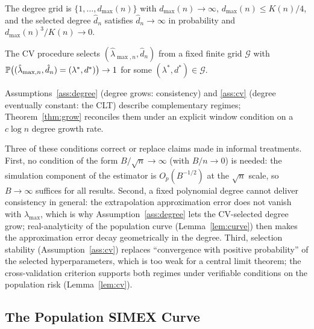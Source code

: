 \begin{assumption}\label{ass:degree}
The degree grid is $\{1,\dots,d_{\max}(n)\}$ with
$d_{\max}(n)\to\infty$, $d_{\max}(n)\le K(n)/4$, and the selected
degree $\hat d_n$ satisfies $\hat d_n\to\infty$ in probability and
$d_{\max}(n)^3/K(n)\to 0$.
\end{assumption}

\begin{assumption}\label{ass:cv}
The CV procedure selects $(\hat\lambda_{\max,n},\hat d_n)$ from a
fixed finite grid $\mathcal G$ with
$\mathbb{P}\bigl((\hat\lambda_{\max,n},\hat d_n)=(\lambda^*,d^*)\bigr)\to1$
for some $(\lambda^*,d^*)\in\mathcal G$.
\end{assumption}

\begin{remark}\label{rem:cvreconcile}
Assumptions~\ref{ass:degree} (degree grows: consistency) and
\ref{ass:cv} (degree eventually constant: the CLT) describe
complementary regimes; Theorem~\ref{thm:grow} reconciles them under an
explicit window condition on a $c\log n$ degree growth rate.
\end{remark}

\begin{remark}\label{rem:assumptions}
Three of these conditions correct or replace claims made in informal
treatments. First, no condition of the form $B/\sqrt n\to\infty$ (with
$B/n\to0$) is needed: the simulation component of the estimator is
$O_p(B^{-1/2})$ at the $\sqrt n$ scale, so $B\to\infty$ suffices for
all results. Second, a fixed polynomial degree cannot deliver
consistency in general: the extrapolation approximation error does
not vanish with $\lambda_{\max}$, which is why
Assumption~\ref{ass:degree} lets the CV-selected degree grow;
real-analyticity of the population curve
(Lemma~\ref{lem:curve}) then makes the approximation error decay
geometrically in the degree. Third, selection stability
(Assumption~\ref{ass:cv}) replaces ``convergence with positive
probability'' of the selected hyperparameters, which is too weak for a
central limit theorem; the cross-validation criterion supports both
regimes under verifiable conditions on the population risk
(Lemma~\ref{lem:cv}).
\end{remark}

\subsection{The Population SIMEX Curve}\label{sec:population}

